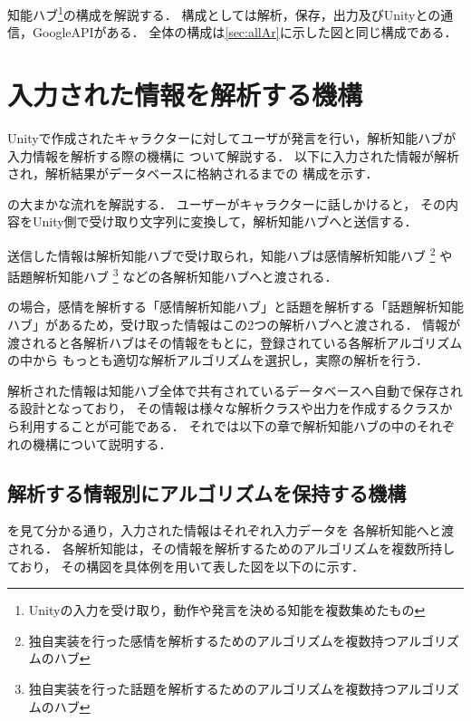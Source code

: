 知能ハブ\footnote{Unityの入力を受け取り，動作や発言を決める知能を複数集めたもの}の構成を解説する．
構成としては解析，保存，出力及びUnityとの通信，GoogleAPIがある．
全体の構成は\ref{sec:allAr}に示した図と同じ構成である．

\section{入力された情報を解析する機構}
Unityで作成されたキャラクターに対してユーザが発言を行い，解析知能ハブが入力情報を解析する際の機構に
ついて解説する．
以下に入力された情報が解析され，解析結果がデータベースに格納されるまでの
構成を示す．


の大まかな流れを解説する．
ユーザーがキャラクターに話しかけると，
その内容をUnity側で受け取り文字列に変換して，解析知能ハブへと送信する．

送信した情報は解析知能ハブで受け取られ，知能ハブは感情解析知能ハブ
\footnote{独自実装を行った感情を解析するためのアルゴリズムを複数持つアルゴリズムのハブ}
や話題解析知能ハブ
\footnote{独自実装を行った話題を解析するためのアルゴリズムを複数持つアルゴリズムのハブ}
などの各解析知能ハブへと渡される．

の場合，感情を解析する「感情解析知能ハブ」と話題を解析する「話題解析知能
ハブ」があるため，受け取った情報はこの2つの解析ハブへと渡される．
情報が渡されると各解析ハブはその情報をもとに，登録されている各解析アルゴリズムの中から
もっとも適切な解析アルゴリズムを選択し，実際の解析を行う．

解析された情報は知能ハブ全体で共有されているデータベースへ自動で保存される設計となっており，
その情報は様々な解析クラスや出力を作成するクラスから利用することが可能である．
それでは以下の章で解析知能ハブの中のそれぞれの機構について説明する．

\subsection{解析する情報別にアルゴリズムを保持する機構}
を見て分かる通り，入力された情報はそれぞれ入力データを
各解析知能へと渡される．
各解析知能は，その情報を解析するためのアルゴリズムを複数所持しており，
その構図を具体例を用いて表した図を以下のに示す．

